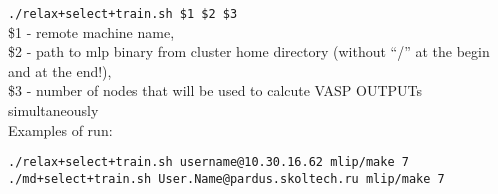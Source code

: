 \documentclass[12pt]{article}
\renewcommand{\_}{\char`_}
\begin{document}
\verb|./relax+select+train.sh $1 $2 $3|\\

\noindent\$1 - remote machine name,\\
\$2 - path to mlp binary from cluster home directory (without “/” at the begin and at the end!), \\
\$3 - number of nodes that will be used to calcute VASP OUTPUTs simultaneously\\

Examples of run:

 \noindent \verb|./relax+select+train.sh username@10.30.16.62 mlip/make 7|\\
 \noindent \verb|./md+select+train.sh User.Name@pardus.skoltech.ru mlip/make 7|
\end{document}
